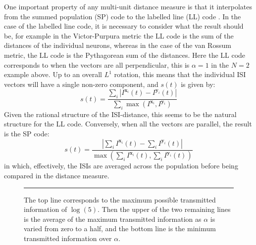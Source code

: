 One important property of any multi-unit distance measure is that it interpolates from the summed population (SP) code  to the labelled line (LL) code .  In the case of the labelled line code, it is necessary to consider what the result should be, for example in the Victor-Purpura metric the LL code is the sum of the distances of the individual neurons, whereas in the case of the van Rossum metric, the LL code is the Pythagorean sum of the distances.  Here the LL code corresponds to when the vectors are all perpendicular,   this is $\alpha=1$ in the $N=2$ example above.  Up to an overall $L^1$ rotation, this means that the individual ISI vectors will have a single non-zero component, and $s(t)$ is given by:
\begin{equation}
s(t) = \frac{\sum_i | I^{\mathbf{x}_i} (t)  - I^{\mathbf{y}_i}(t)|}{\sum_i \max (I^{\mathbf{x}_i},I^{\mathbf{y}_i})}
 \end{equation}
 Given the rational structure of the ISI-distance, this seems to be the natural structure for the LL code.  
Conversely, when all the vectors are parallel, the result is the SP code:
\begin{equation}
s(t) = \frac{| \sum_i I^{\mathbf{x}_i}(t) - \sum_i I^{\mathbf{y}_i}(t) |}{\max (\sum_i I^{\mathbf{x}_i}(t),\sum_i I^{\mathbf{y}_i}(t) )}
\end{equation}
in which, effectively, the ISIs are averaged across the population before being compared in the distance measure.
%
%
\begin{figure}[htb]

\bigskip
\rule{35em}{0.5pt}
\caption{\label{mmav}The top line corresponds to the maximum possible transmitted information of $\log(5)$.  Then the upper of the two remaining lines is the average of the maximum transmitted information as $\alpha$ is varied from zero to a half, and the bottom line is the minimum transmitted information over $\alpha$.}
\end{figure}

